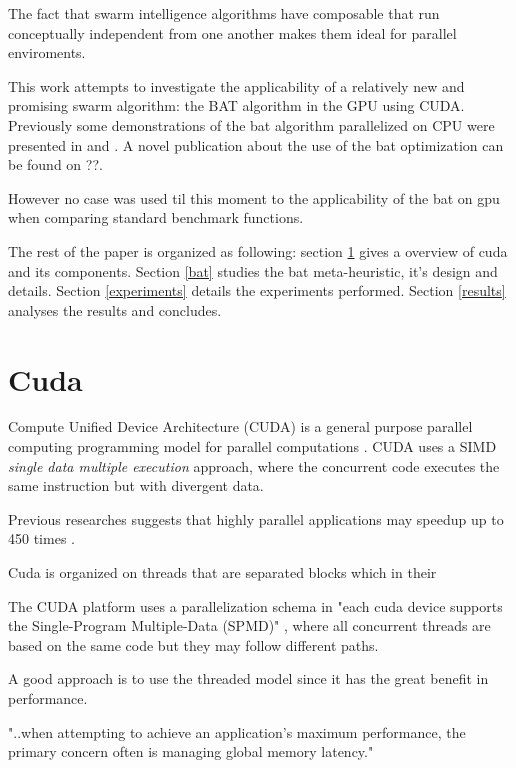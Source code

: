 \documentclass[conference]{IEEEtran}
\begin{document}
The fact that swarm intelligence algorithms have composable that run
conceptually independent from one another makes them ideal for parallel
enviroments.

This work attempts to investigate the applicability of a relatively new
and promising swarm algorithm: the BAT algorithm in the GPU using CUDA.
Previously some demonstrations of the bat algorithm parallelized on CPU
were presented in \cite{paralellCPUFirst} and \cite{paralellCPU}. A
novel publication about the use of the bat optimization can be found on
??.

However no case was used til this moment to the applicability of the bat on gpu when comparing standard benchmark functions.

The rest of the paper is organized as following: section \ref{cuda} gives a overview of cuda and its components. Section \ref{bat} studies 
the bat meta-heuristic, it's design and details. Section \ref{experiments} details the experiments performed. Section \ref{results} analyses the results and concludes.

\section{Cuda} \label{cuda}%

Compute Unified Device Architecture (CUDA) is a general purpose
parallel computing programming model for parallel computations \cite{cudaDefinition}. CUDA    
uses a SIMD \textit{single data multiple execution} approach, where the 
concurrent code executes the same instruction but with divergent data.  

Previous researches suggests that highly parallel
applications may speedup up to 450 times \cite{cuda_optimizations}.


Cuda is organized on threads that are separated blocks which in their

The CUDA platform uses a parallelization schema in "each cuda
device supports the Single-Program Multiple-Data (SPMD)"
\cite{cuda_optimizations}, where all concurrent threads are based on the
same code but they may follow different paths.

A good approach is to use the threaded model since it has the great benefit in performance.

"..when attempting to achieve an application's maximum
performance, the primary concern often is managing global memory
latency." \cite{cuda_optimizations}
\end{document}
